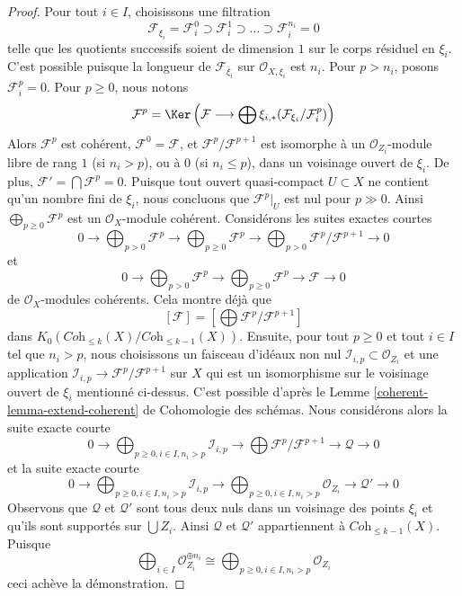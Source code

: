 \begin{proof}
\medskip\noindent
Pour tout $i \in I$, choisissons une filtration
$$
\mathcal{F}_{\xi_i} = \mathcal{F}_i^0 \supset \mathcal{F}_i^1 \supset
\ldots \supset \mathcal{F}_i^{n_i} = 0
$$
telle que les quotients successifs soient de dimension $1$ sur le corps
résiduel en $\xi_i$. C'est possible puisque la longueur de $\mathcal{F}_{\xi_i}$
sur $\mathcal{O}_{X, \xi_i}$ est $n_i$.
Pour $p > n_i$, posons $\mathcal{F}_i^p = 0$. Pour $p \geq 0$, nous notons
$$
\mathcal{F}^p =
\Ker\left(\mathcal{F} \longrightarrow \bigoplus
\xi_{i, *}(\mathcal{F}_{\xi_i}/\mathcal{F}_i^p)\right)
$$
Alors $\mathcal{F}^p$ est cohérent, $\mathcal{F}^0 = \mathcal{F}$, et
$\mathcal{F}^p/\mathcal{F}^{p + 1}$ est isomorphe à un
$\mathcal{O}_{Z_i}$-module libre de rang $1$ (si $n_i > p$), ou à $0$
(si $n_i \leq p$), dans un voisinage ouvert de $\xi_i$. De plus,
$\mathcal{F}' = \bigcap \mathcal{F}^p = 0$. Puisque tout ouvert quasi-compact
$U \subset X$ ne contient qu'un nombre fini de $\xi_i$,
nous concluons que $\mathcal{F}^p|_U$ est nul pour $p \gg 0$.
Ainsi $\bigoplus_{p \geq 0} \mathcal{F}^p$ est un
$\mathcal{O}_X$-module cohérent. Considérons les suites exactes courtes
$$
0 \to
\bigoplus\nolimits_{p > 0} \mathcal{F}^p \to
\bigoplus\nolimits_{p \geq 0} \mathcal{F}^p \to
\bigoplus\nolimits_{p > 0} \mathcal{F}^p/\mathcal{F}^{p + 1} \to 0
$$
et
$$
0 \to
\bigoplus\nolimits_{p > 0} \mathcal{F}^p \to
\bigoplus\nolimits_{p \geq 0} \mathcal{F}^p \to
\mathcal{F} \to 0
$$
de $\mathcal{O}_X$-modules cohérents. Cela montre déjà que
$$
[\mathcal{F}] = [\bigoplus \mathcal{F}^p/\mathcal{F}^{p + 1}]
$$
dans $K_0(\textit{Coh}_{\leq k}(X)/\textit{Coh}_{\leq k - 1}(X))$.
Ensuite, pour tout $p \geq 0$ et tout $i \in I$ tel que $n_i > p$,
nous choisissons un faisceau d'idéaux non nul $\mathcal{I}_{i, p} \subset \mathcal{O}_{Z_i}$
et une application $\mathcal{I}_{i, p} \to \mathcal{F}^p/\mathcal{F}^{p + 1}$ sur $X$
qui est un isomorphisme sur le voisinage ouvert de $\xi_i$
mentionné ci-dessus. C'est possible d'après le
Lemme \ref{coherent-lemma-extend-coherent} de Cohomologie des schémas.
Nous considérons alors la suite exacte courte
$$
0 \to
\bigoplus\nolimits_{p \geq 0, i \in I, n_i > p} \mathcal{I}_{i, p}
\to
\bigoplus \mathcal{F}^p/\mathcal{F}^{p + 1} \to
\mathcal{Q} \to 0
$$
et la suite exacte courte
$$
0 \to
\bigoplus\nolimits_{p \geq 0, i \in I, n_i > p} \mathcal{I}_{i, p}
\to
\bigoplus\nolimits_{p \geq 0, i \in I, n_i > p} \mathcal{O}_{Z_i}
\to
\mathcal{Q}' \to 0
$$
Observons que $\mathcal{Q}$ et $\mathcal{Q}'$ sont tous deux nuls dans un voisinage
des points $\xi_i$ et qu'ils sont supportés sur $\bigcup Z_i$.
Ainsi $\mathcal{Q}$ et $\mathcal{Q}'$ appartiennent à
$\textit{Coh}_{\leq k - 1}(X)$.
Puisque
$$
\bigoplus\nolimits_{i \in I} \mathcal{O}_{Z_i}^{\oplus n_i} \cong
\bigoplus\nolimits_{p \geq 0, i \in I, n_i > p} \mathcal{O}_{Z_i}
$$
ceci achève la démonstration.
\end{proof}


